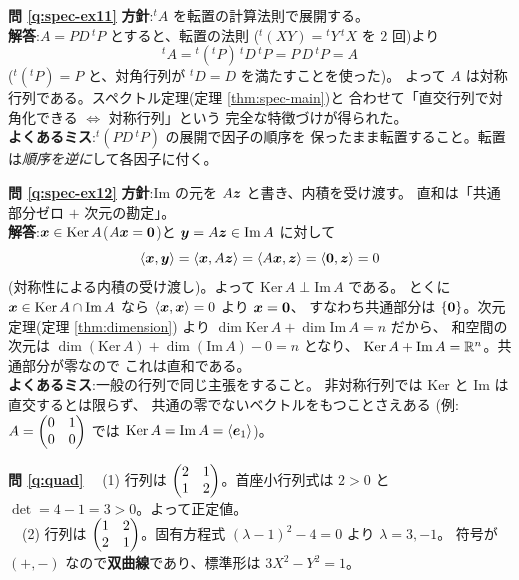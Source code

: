 \bigskip
\noindent\textbf{問 \ref{q:spec-ex11}}\quad
\textbf{方針}:${}^t\!A$ を転置の計算法則で展開する。\\
\textbf{解答}:$A = PD\,{}^t\!P$ とすると、転置の法則
(${}^t(XY) = {}^tY\,{}^tX$ を $2$ 回)より
\[
{}^t\!A = {}^t({}^t\!P)\,{}^t\!D\,{}^t\!P = P\,D\,{}^t\!P = A
\]
(${}^t({}^t\!P) = P$ と、対角行列が ${}^t\!D = D$ を満たすことを使った)。
よって $A$ は対称行列である。スペクトル定理(定理 \ref{thm:spec-main})と
合わせて「直交行列で対角化できる $\iff$ 対称行列」という
完全な特徴づけが得られた。\\
\textbf{よくあるミス}:${}^t(PD\,{}^t\!P)$ の展開で因子の順序を
保ったまま転置すること。転置は\emph{順序を逆に}して各因子に付く。

\bigskip
\noindent\textbf{問 \ref{q:spec-ex12}}\quad
\textbf{方針}:$\mathrm{Im}$ の元を $A\bm{z}$ と書き、内積を受け渡す。
直和は「共通部分ゼロ $+$ 次元の勘定」。\\
\textbf{解答}:$\bm{x} \in \mathrm{Ker}\,A$($A\bm{x} = \bm{0}$)と
$\bm{y} = A\bm{z} \in \mathrm{Im}\,A$ に対して
\[
\langle \bm{x}, \bm{y} \rangle = \langle \bm{x}, A\bm{z} \rangle
= \langle A\bm{x}, \bm{z} \rangle = \langle \bm{0}, \bm{z} \rangle = 0
\]
(対称性による内積の受け渡し)。よって
$\mathrm{Ker}\,A \perp \mathrm{Im}\,A$ である。
とくに $\bm{x} \in \mathrm{Ker}\,A \cap \mathrm{Im}\,A$ なら
$\langle \bm{x}, \bm{x} \rangle = 0$ より $\bm{x} = \bm{0}$、
すなわち共通部分は $\{\bm{0}\}$。次元定理(定理 \ref{thm:dimension})
より $\dim \mathrm{Ker}\,A + \dim \mathrm{Im}\,A = n$ だから、
和空間の次元は
$\dim(\mathrm{Ker}\,A) + \dim(\mathrm{Im}\,A) - 0 = n$ となり、
$\mathrm{Ker}\,A + \mathrm{Im}\,A = \mathbb{R}^n$。共通部分が零なので
これは直和である。\\
\textbf{よくあるミス}:一般の行列で同じ主張をすること。
非対称行列では $\mathrm{Ker}$ と $\mathrm{Im}$ は直交するとは限らず、
共通の零でないベクトルをもつことさえある
(例:$A = \begin{pmatrix}0 & 1 \\ 0 & 0\end{pmatrix}$ では
$\mathrm{Ker}\,A = \mathrm{Im}\,A = \langle \bm{e}_1 \rangle$)。

\bigskip
\noindent\textbf{問 \ref{q:quad}}\quad
　(1) 行列は $\begin{pmatrix}2 & 1 \\ 1 & 2\end{pmatrix}$。首座小行列式は
$2 > 0$ と $\det = 4 - 1 = 3 > 0$。よって正定値。\\
　(2) 行列は $\begin{pmatrix}1 & 2 \\ 2 & 1\end{pmatrix}$。固有方程式
$(\lambda - 1)^2 - 4 = 0$ より $\lambda = 3, -1$。
符号が $(+, -)$ なので\textbf{双曲線}であり、標準形は
$3X^2 - Y^2 = 1$。

